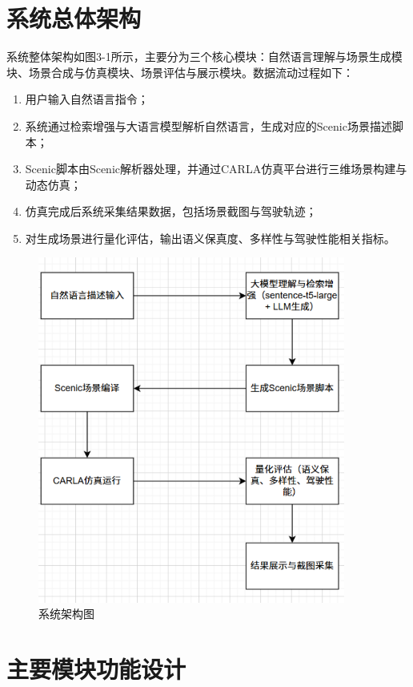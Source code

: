 \section{系统总体架构}
系统整体架构如图3-1所示，主要分为三个核心模块：自然语言理解与场景生成模块、场景合成与仿真模块、场景评估与展示模块。数据流动过程如下：
\begin{enumerate}
	\item 用户输入自然语言指令；
	\item 系统通过检索增强与大语言模型解析自然语言，生成对应的Scenic场景描述脚本；
	\item Scenic脚本由Scenic解析器处理，并通过CARLA仿真平台进行三维场景构建与动态仿真；
	\item 仿真完成后系统采集结果数据，包括场景截图与驾驶轨迹；
	\item 对生成场景进行量化评估，输出语义保真度、多样性与驾驶性能相关指标。
\end{enumerate}
\begin{figure}[H]
	\centering
	\includegraphics[width=0.9\textwidth]{../images/系统架构图.pdf} 
	\caption{系统架构图}
	\label{fig:system_architecture} %
\end{figure}

\section{主要模块功能设计}
